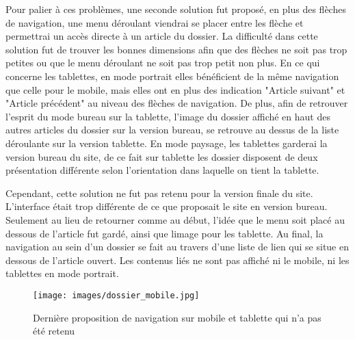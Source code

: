 \documentclass[12pt,a4paper]{article}
\begin{document}
Pour palier à ces problèmes, une seconde solution fut proposé, en plus des flèches de navigation, une menu déroulant viendrai se placer entre les flèche et permettrai un accès directe à un article du dossier. La difficulté dans cette solution fut de trouver les bonnes dimensions afin que des flèches ne soit pas trop petites ou que le menu déroulant ne soit pas trop petit non plus. En ce qui concerne les tablettes, en mode portrait elles bénéficient de la même navigation que celle pour le mobile, mais elles ont en plus des indication "Article suivant" et "Article précédent" au niveau des flèches de navigation. De plus, afin de retrouver l'esprit du mode bureau sur la tablette, l'image du dossier affiché en haut des autres articles du dossier sur la version bureau, se retrouve au dessus de la liste déroulante sur la version tablette. En mode paysage, les tablettes garderai la version bureau du site, de ce fait sur tablette les dossier disposent de deux présentation différente selon l'orientation dans laquelle on tient la tablette.\par
Cependant, cette solution ne fut pas retenu pour la version finale du site. L'interface était trop différente de ce que proposait le site en version bureau. Seulement au lieu de retourner comme au début, l'idée que le menu soit placé au dessous de l'article fut gardé, ainsi que limage pour les tablette. Au final, la navigation au sein d'un dossier se fait au travers d'une liste de lien qui se situe en dessous de l'article ouvert. Les contenus liés ne sont pas affiché ni le mobile, ni les tablettes en mode portrait.\par

\begin{figure}[h!]
\centering\texttt{[image: images/dossier\_mobile.jpg]} 
\caption{Dernière proposition de navigation sur mobile et tablette qui n'a pas été retenu}
\end{figure}
\newpage
\end{document}

